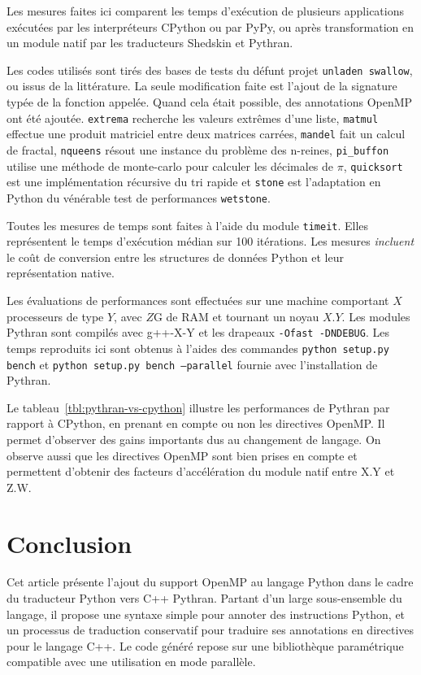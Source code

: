 \documentclass[renpar]{compas2013}
\begin{document}
Les mesures faites ici comparent les temps d'exécution de plusieurs
applications exécutées par les interpréteurs CPython ou par PyPy, ou après
transformation en un module natif par les traducteurs Shedskin et Pythran.

Les codes utilisés sont tirés des bases de tests du défunt projet
\texttt{unladen swallow}, ou issus de la littérature. La seule
modification faite est l'ajout de la signature typée de la fonction
appelée. Quand cela était possible, des annotations OpenMP ont été
ajoutée. \texttt{extrema} recherche les valeurs extrêmes d'une liste,
\texttt{matmul} effectue une produit matriciel entre deux matrices
carrées, \texttt{mandel} fait un calcul de fractal, \texttt{nqueens}
résout une instance du problème des n-reines, \texttt{pi\_buffon} utilise
une méthode de monte-carlo pour calculer les décimales de $\pi$,
\texttt{quicksort} est une implémentation récursive du tri rapide et
\texttt{stone} est l'adaptation en Python du vénérable test de
performances \texttt{wetstone}.

Toutes les mesures de temps sont faites à l'aide du module
\texttt{timeit}. Elles représentent le temps d'exécution médian sur 100
itérations. Les mesures \emph{incluent} le coût de conversion entre les
structures de données Python et leur représentation native.

Les évaluations de performances sont effectuées sur une machine comportant
$X$ processeurs de type $Y$, avec $Z$G de RAM et tournant un noyau $X.Y$.
Les modules Pythran sont compilés avec g++-X-Y et les drapeaux
\texttt{-Ofast -DNDEBUG}.
Les temps reproduits ici sont obtenus à l'aides des commandes
\texttt{python setup.py bench} et \texttt{python setup.py bench
--parallel} fournie avec l'installation de Pythran.

Le tableau~\ref{tbl:pythran-vs-cpython} illustre les performances de
Pythran par rapport à CPython, en prenant en compte ou non les directives
OpenMP. Il permet d'observer des gains importants dus au changement de
langage. On observe aussi que les directives OpenMP sont bien prises en
compte et permettent d'obtenir des facteurs d'accélération du module natif
entre X.Y et Z.W.

\section{Conclusion}

Cet article présente l'ajout du support OpenMP au langage Python dans le
cadre du traducteur Python vers C++ Pythran. Partant d'un large
sous-ensemble du langage, il propose une syntaxe simple pour annoter des
instructions Python, et un processus de traduction conservatif pour
traduire ses annotations en directives pour le langage C++. Le code généré
repose sur une bibliothèque paramétrique compatible avec une utilisation
en mode parallèle.
\end{document}
